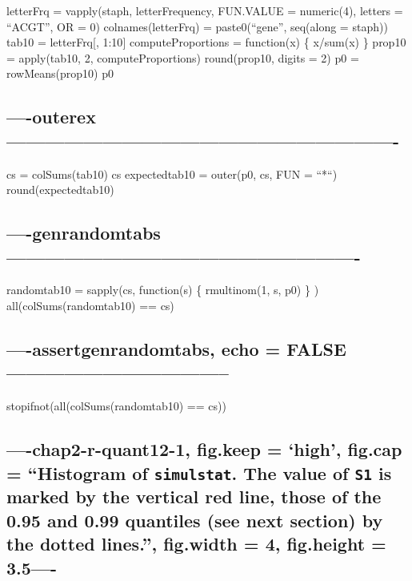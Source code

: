 \documentclass[]{article}
\begin{document}
letterFrq = vapply(staph, letterFrequency, FUN.VALUE = numeric(4),
letters = ``ACGT'', OR = 0) colnames(letterFrq) = paste0(``gene'',
seq(along = staph)) tab10 = letterFrq{[}, 1:10{]} computeProportions =
function(x) \{ x/sum(x) \} prop10 = apply(tab10, 2, computeProportions)
round(prop10, digits = 2) p0 = rowMeans(prop10) p0

\subsection{----outerex-------------------------------------------------------------}\label{outerex-}

cs = colSums(tab10) cs expectedtab10 = outer(p0, cs, FUN = ``*``)
round(expectedtab10)

\subsection{----genrandomtabs-------------------------------------------------------}\label{genrandomtabs-}

randomtab10 = sapply(cs, function(s) \{ rmultinom(1, s, p0) \} )
all(colSums(randomtab10) == cs)

\subsection{----assertgenrandomtabs, echo =
FALSE-----------------------------------}\label{assertgenrandomtabs-echo-false}

stopifnot(all(colSums(randomtab10) == cs))

\subsection{\texorpdfstring{----chap2-r-quant12-1, fig.keep = `high',
fig.cap = ``Histogram of \texttt{simulstat}. The value of \texttt{S1} is
marked by the vertical red line, those of the 0.95 and 0.99 quantiles
(see next section) by the dotted lines.'', fig.width = 4, fig.height =
3.5----}{----chap2-r-quant12-1, fig.keep = high, fig.cap = Histogram of simulstat. The value of S1 is marked by the vertical red line, those of the 0.95 and 0.99 quantiles (see next section) by the dotted lines., fig.width = 4, fig.height = 3.5----}}\label{chap2-r-quant12-1-fig.keep-high-fig.cap-histogram-of-simulstat.-the-value-of-s1-is-marked-by-the-vertical-red-line-those-of-the-0.95-and-0.99-quantiles-see-next-section-by-the-dotted-lines.-fig.width-4-fig.height-3.5-}
\end{document}
